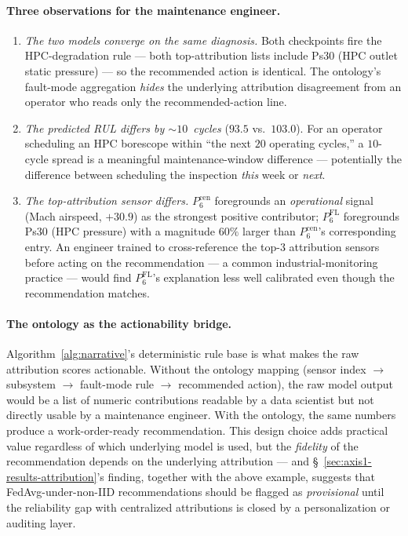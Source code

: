 \documentclass[a4paper,fleqn,doubleblind]{cas-sc}
\begin{document}
\paragraph{Three observations for the maintenance engineer.}
\begin{enumerate}
    \item \emph{The two models converge on the same diagnosis.} Both checkpoints fire the HPC-degradation rule --- both top-attribution lists include Ps30 (HPC outlet static pressure) --- so the recommended action is identical. The ontology's fault-mode aggregation \emph{hides} the underlying attribution disagreement from an operator who reads only the recommended-action line.
    \item \emph{The predicted RUL differs by $\sim 10$~cycles} ($93.5$ vs.\ $103.0$). For an operator scheduling an HPC borescope within ``the next $20$ operating cycles,'' a $10$-cycle spread is a meaningful maintenance-window difference --- potentially the difference between scheduling the inspection \emph{this} week or \emph{next}.
    \item \emph{The top-attribution sensor differs.} $P_6^{\mathrm{cen}}$ foregrounds an \emph{operational} signal (Mach airspeed, $+30.9$) as the strongest positive contributor; $P_6^{\mathrm{FL}}$ foregrounds Ps30 (HPC pressure) with a magnitude $60\%$ larger than $P_6^{\mathrm{cen}}$'s corresponding entry. An engineer trained to cross-reference the top-3 attribution sensors before acting on the recommendation --- a common industrial-monitoring practice --- would find $P_6^{\mathrm{FL}}$'s explanation less well calibrated even though the recommendation matches.
\end{enumerate}

\paragraph{The ontology as the actionability bridge.}
Algorithm~\ref{alg:narrative}'s deterministic rule base is what makes
the raw attribution scores actionable. Without the ontology mapping
(sensor index $\to$ subsystem $\to$ fault-mode rule $\to$ recommended
action), the raw model output would be a list of numeric contributions
readable by a data scientist but not directly usable by a maintenance
engineer. With the ontology, the same numbers produce a work-order-ready
recommendation. This design choice adds practical value regardless of
which underlying model is used, but the \emph{fidelity} of the
recommendation depends on the underlying attribution --- and
\S~\ref{sec:axis1-results-attribution}'s finding, together with the
above example, suggests that FedAvg-under-non-IID recommendations should
be flagged as \emph{provisional} until the reliability gap with
centralized attributions is closed by a personalization or auditing
layer.
\end{document}
